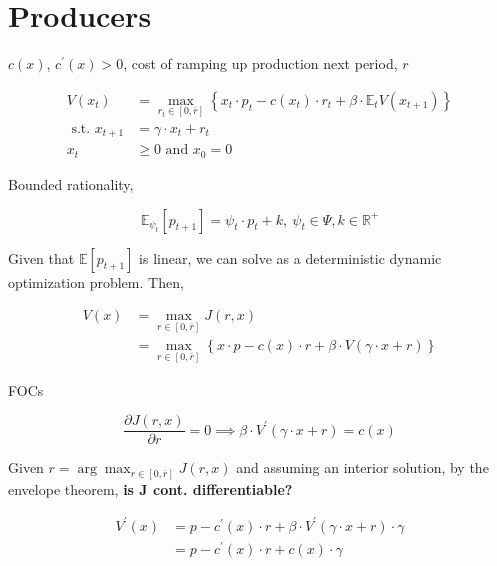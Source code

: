 \documentclass[american]{scrartcl}
\newcommand{\E}{\mathbb{E}}
\newcommand{\R}{\mathbb{R}}
\begin{document}
\section{Producers}

$c(x)$, $c^\prime(x) > 0$, cost of ramping up production next period, $r$

\begin{equation}
	\begin{split}
		V(x_t) &= \max_{r_t \in [0, \bar{r}]} \left\{ x_t \cdot p_t - c(x_t) \cdot r_t + \beta \cdot \E_t V(x_{t+1}) \right\} \\
		\text{ s.t. } x_{t+1} &= \gamma \cdot x_t + r_t \\ x_t &\geq 0 \text{ and } x_0 = 0
	\end{split}
\end{equation}

Bounded rationality,

\begin{equation}
	\E_{\psi_t}[p_{t+1}] = \psi_t \cdot p_t + k, \ \psi_t \in \Psi, k \in \R^+
\end{equation}


Given that $\E\left[p_{t+1}\right]$ is linear, we can solve as a deterministic dynamic optimization problem. Then,

\begin{equation}
	\begin{split}
		V(x) &= \max_{r \in [0, \bar{r}]} J(r, x) \\
		&= \max_{r \in [0, \bar{r}]} \left\{ x \cdot p - c(x) \cdot r + \beta \cdot V(\gamma \cdot x + r) \right\}
	\end{split}
\end{equation}

FOCs

\begin{equation}
	\frac{\partial J(r, x)}{\partial r} = 0 \implies \beta \cdot V^\prime (\gamma \cdot x + r) = c(x)
\end{equation}

Given $r = \arg\max_{r \in [0, \bar{r}]} J(r, x)$ and assuming an interior solution, by the envelope theorem, \textbf{is J cont. differentiable?}

\begin{equation}
	\begin{split}
		V^\prime (x) &= p - c^\prime(x) \cdot r + \beta \cdot V^\prime(\gamma \cdot x + r) \cdot \gamma \\
		&= p - c^\prime(x) \cdot r + c(x) \cdot \gamma
	\end{split}
\end{equation}
\end{document}
